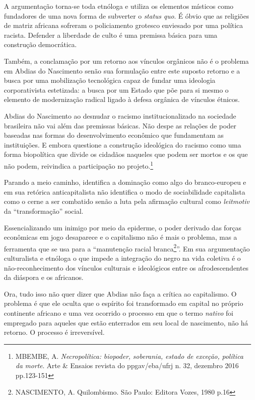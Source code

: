 A argumentação torna-se toda etnóloga e utiliza os elementos místicos
como fundadores de uma nova forma de subverter o \emph{status quo}. É
óbvio que as religiões de matriz africana sofreram o policiamento
grotesco enviesado por uma política racista. Defender a liberdade de
culto é uma premissa básica para uma construção democrática.

Também, a conclamação por um retorno aos vínculos orgânicos não é o
problema em Abdias do Nascimento senão sua formulação entre este suposto
retorno e a busca por uma mobilização tecnológica capaz de fundar uma
ideologia corporativista estetizada: a busca por um Estado que põe para
si mesmo o elemento de modernização radical ligado à defesa orgânica de
vínculos étnicos.

Abdias do Nascimento ao desnudar o racismo institucionalizado na
sociedade brasileira não vai além das premissas básicas. Não despe as
relações de poder baseadas nas formas do desenvolvimento econômico que
fundamentam as instituições. E embora questione a construção ideológica
do racismo como uma forma biopolítica que divide os cidadãos naqueles
que podem ser mortos e os que não podem, reivindica a participação no
projeto.\footnote{MBEMBE, A. \emph{Necropolítica: biopoder, soberania,
  estado de exceção, política da morte}. Arte \& Ensaios revista do
  ppgav/eba/ufrj n. 32, dezembro 2016 pp.123-151}

Parando a meio caminho, identifica a dominação como algo do
branco-europeu e em sua retórica anticapitalista não identifica o modo
de sociabilidade capitalista como o cerne a ser combatido senão a luta
pela afirmação cultural como \emph{leitmotiv} da ``transformação''
social.

Essencializando um inimigo por meio da epiderme, o poder derivado das
forças econômicas em jogo desaparece e o capitalismo não é mais o
problema, mas a ferramenta que se usa para a ``manutenção racial
branca\footnote{NASCIMENTO, A. Quilombismo. São Paulo: Editora Vozes,
  1980 p.16}''. Em sua argumentação culturalista e etnóloga o que impede
a integração do negro na vida coletiva é o não-reconhecimento dos
vínculos culturais e ideológicos entre os afrodescendentes da diáspora e
os africanos.

Ora, tudo isso não quer dizer que Abdias não faça a crítica ao
capitalismo. O problema é que ele oculta que o espírito foi transformado
em capital no próprio continente africano e uma vez ocorrido o processo
em que o termo \emph{nativo} foi empregado para aqueles que estão
enterrados em seu local de nascimento, não há retorno. O processo é
irreversível.

